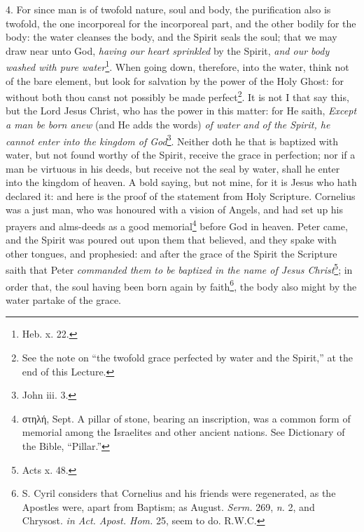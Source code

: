 4. For since man is of twofold nature, soul and body, the purification also is twofold, the one incorporeal for the incorporeal part, and the other bodily for the body: the water cleanses the body, and the Spirit seals the soul; that we may draw near unto God, \emph{having our heart sprinkled} by the Spirit, \emph{and our body washed with pure water}\footnote{Heb. x. 22.}. When going down, therefore, into the water, think not of the bare element, but look for salvation by the power of the Holy Ghost: for without both thou canst not possibly be made perfect\footnote{See the note on “the twofold grace perfected by water and the Spirit,” at the end of this Lecture.}. It is not I that say this, but the Lord Jesus Christ, who has the power in this matter: for He saith, \emph{Except a man be born anew} (and He adds the words) \emph{of water and of the Spirit, he cannot enter into the kingdom of God}\footnote{John iii. 3.}. Neither doth he that is baptized with water, but not found worthy of the Spirit, receive the grace in perfection; nor if a man be virtuous in his deeds, but receive not the seal by water, shall he enter into the kingdom of heaven. A bold saying, but not mine, for it is Jesus who hath declared it: and here is the proof of the statement from Holy Scripture. Cornelius was a just man, who was honoured with a vision of Angels, and had set up his prayers and alms-deeds as a good memorial\footnote{\textgreek{στηλή}, Sept. A pillar of stone, bearing an inscription, was a common form of memorial among the Israelites and other ancient nations. See Dictionary of the Bible, “Pillar.”} before God in heaven. Peter came, and the Spirit was poured out upon them that believed, and they spake with other tongues, and prophesied: and after the grace of the Spirit the Scripture saith that Peter \emph{commanded them to be baptized in the name of Jesus Christ}\footnote{Acts x. 48.}; in order that, the soul having been born again by faith\footnote{S. Cyril considers that Cornelius and his friends were regenerated, as the Apostles were, apart from Baptism; as August. \emph{Serm.} 269, \emph{n.} 2, and Chrysost. \emph{in Act. Apost. Hom.} 25, seem to do. R.W.C.}, the body also might by the water partake of the grace.

